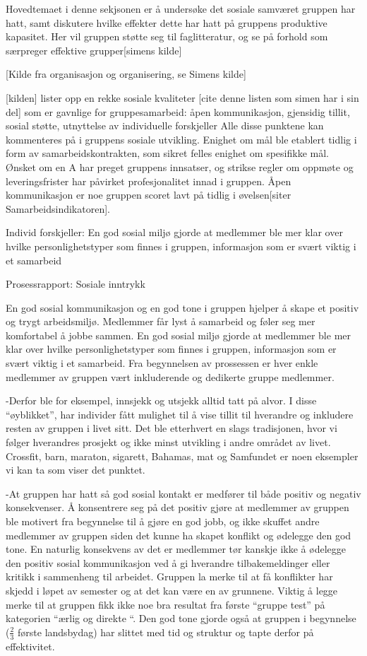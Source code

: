 Hovedtemaet i denne sekjsonen er å undersøke det sosiale samværet gruppen har hatt, samt diskutere hvilke effekter dette har hatt på gruppens produktive kapasitet. Her vil gruppen støtte seg til faglitteratur, og se på forhold som særpreger effektive grupper[simens kilde]

[Kilde fra organisasjon og organisering, se Simens kilde]

[kilden] lister opp en rekke sosiale kvaliteter [cite denne listen som simen har i sin del] som er gavnlige for gruppesamarbeid:  åpen kommunikasjon, gjensidig tillit, sosial støtte, utnyttelse av individuelle forskjeller
Alle disse punktene kan kommenteres på i gruppens sosiale utvikling.
Enighet om mål ble etablert tidlig i form av samarbeidskontrakten, som sikret felles enighet om spesifikke mål. Ønsket om en A har preget gruppens innsatser, og strikse regler om oppmøte og leveringsfrister har påvirket profesjonalitet innad i gruppen. 
Åpen kommunikasjon er noe gruppen scoret lavt på tidlig i øvelsen[siter Samarbeidsindikatoren]. 


Individ forskjeller: En god sosial miljø gjorde at medlemmer ble mer klar over hvilke personlighetstyper som finnes i gruppen, informasjon som er svært viktig i et samarbeid



Prosessrapport: Sosiale inntrykk

En god sosial kommunikasjon og en god tone i gruppen hjelper å skape et positiv og trygt arbeidsmiljø. Medlemmer får lyst å samarbeid og føler seg mer komfortabel å jobbe sammen. En god sosial miljø gjorde at medlemmer ble mer klar over hvilke personlighetstyper som finnes i gruppen, informasjon som er svært viktig i et samarbeid. Fra begynnelsen av prossessen er hver enkle medlemmer av gruppen vært inkluderende og dedikerte gruppe medlemmer. 

-Derfor ble for eksempel, innsjekk og utsjekk alltid tatt på alvor. I disse “øyblikket”, har individer fått mulighet til å vise tillit til hverandre og inkludere resten av gruppen i livet sitt. 
Det ble etterhvert en slags tradisjonen, hvor vi følger hverandres prosjekt og ikke minst utvikling i andre området av livet. Crossfit, barn, maraton, sigarett, Bahamas, mat og Samfundet er noen eksempler vi kan ta som viser det punktet. 

-At gruppen har hatt så god sosial kontakt er medfører til både positiv og negativ konsekvenser. Å konsentrere seg på det positiv gjøre at medlemmer av gruppen ble motivert fra begynnelse til å gjøre en god jobb, og ikke skuffet andre medlemmer av gruppen siden det kunne ha skapet konflikt og ødelegge den god tone. En naturlig konsekvens av det er medlemmer tør kanskje ikke å ødelegge den positiv sosial kommunikasjon ved å gi hverandre tilbakemeldinger eller kritikk i sammenheng til arbeidet. Gruppen la merke til at få konflikter har skjedd i løpet av semester og at det kan være en av grunnene. Viktig å legge merke til at gruppen fikk ikke noe bra resultat fra første “gruppe test” på kategorien “ærlig og direkte “. Den god tone gjorde også at gruppen i begynnelse ($\frac{2}{3}$ første landsbydag)  har slittet med tid og struktur og tapte derfor på effektivitet. 

